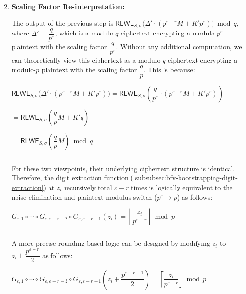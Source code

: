 \begin{tcolorbox}[title={\textbf{\tboxlabel{\ref*{subsubsec:bfv-bootstrapping-summary}} BFV Bootstrapping}}]
\begin{enumerate}
$ $

\item \textbf{\underline{Scaling Factor Re-interpretation}:}

The output of the previous step is $\textsf{RLWE}_{S, \sigma}\bm(\Delta' \cdot (p^{\varepsilon-r}M + K'p^\varepsilon) \bm) \bmod q$, where $\Delta' = \dfrac{q}{p^\varepsilon}$, which is a modulo-$q$ ciphertext encrypting a modulo-$p^\varepsilon$ plaintext with the scaling factor $\dfrac{q}{p^\varepsilon}$. Without any additional computation, we can theoretically view this ciphertext as a modulo-$q$ ciphertext encrypting a modulo-$p$ plaintext with the scaling factor $\dfrac{q}{p}$. This is because: 

$\textsf{RLWE}_{S, \sigma}\bm(\Delta' \cdot (p^{\varepsilon-r}M + K'p^\varepsilon) \bm) = \textsf{RLWE}_{S, \sigma}\left(\dfrac{q}{p^\varepsilon} \cdot (p^{\varepsilon-r}M + K'p^\varepsilon) \right)$

$ = \textsf{RLWE}_{S, \sigma}\left(\dfrac{q}{p}M + K'q \right)$

$ = \textsf{RLWE}_{S, \sigma}\left(\dfrac{q}{p}M \right) \bmod q$

$ $

For these two viewpoints, their underlying ciphertext structure is identical. Therefore, the digit extraction function (\autoref{subsubsec:bfv-bootstrapping-digit-extraction}) at $z_i$ recursively total $\varepsilon-r$ times is logically equivalent to the noise elimination and plaintext modulus switch ($p^\varepsilon \rightarrow p$) as follows:

$G_{\varepsilon,1} \circ \cdots \circ G_{\varepsilon,\varepsilon-r-2} \circ G_{\varepsilon,\varepsilon-r-1}(z_i) = \left\lfloor \dfrac{z_i}{p^{\varepsilon-r}} \right\rfloor \bmod p$ 

$ $

A more precise rounding-based logic can be designed by modifying $z_i$ to $z_i + \dfrac{p^{\varepsilon-r}}{2}$ as follows:


$G_{\varepsilon,1} \circ \cdots \circ G_{\varepsilon,\varepsilon-r-2} \circ G_{\varepsilon,\varepsilon-r-1}\left(z_i + \dfrac{p^{\varepsilon-r-1}}{2}\right) = \left\lceil \dfrac{z_i}{p^{\varepsilon-r}} \right\rfloor \bmod p$


\end{enumerate}



\end{tcolorbox}


